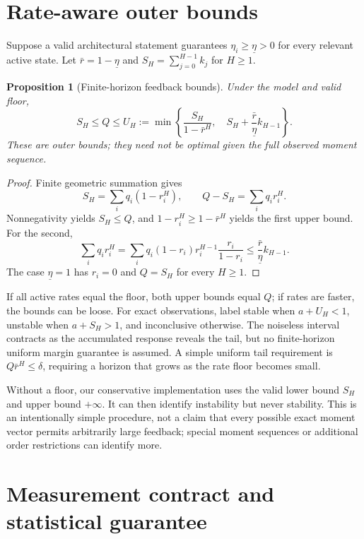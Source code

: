 \documentclass[11pt]{article}
\newtheorem{proposition}[theorem]{Proposition}
\theoremstyle{remark}\newtheorem{remark}[theorem]{Remark}
\newcommand{\floorate}{\underline\eta}
\begin{document}
\section{Rate-aware outer bounds}\label{sec:bounds}
Suppose a valid architectural statement guarantees $\eta_i\ge\floorate>0$ for every relevant active state. Let $\bar r=1-\floorate$ and $S_H=\sum_{j=0}^{H-1}k_j$ for $H\ge1$.
\begin{proposition}[Finite-horizon feedback bounds]\label{prop:bounds}
Under the model and valid floor,
\begin{equation}
 S_H\le Q\le U_H:=\min\left\{
 \frac{S_H}{1-\bar r^H},\quad
 S_H+\frac{\bar r}{\floorate}k_{H-1}\right\}.\label{eq:bounds}
\end{equation}
These are outer bounds; they need not be optimal given the full observed moment sequence.
\end{proposition}
\begin{proof}
Finite geometric summation gives
\begin{equation}
 S_H=\sum_iq_i(1-r_i^H),\qquad Q-S_H=\sum_iq_ir_i^H.
\end{equation}
Nonnegativity yields $S_H\le Q$, and $1-r_i^H\ge1-\bar r^H$ yields the first upper bound. For the second,
\begin{equation}
 \sum_iq_ir_i^H
 =\sum_iq_i(1-r_i)r_i^{H-1}\frac{r_i}{1-r_i}
 \le\frac{\bar r}{\floorate}k_{H-1}.
\end{equation}
The case $\floorate=1$ has $r_i=0$ and $Q=S_H$ for every $H\ge1$.
\end{proof}
If all active rates equal the floor, both upper bounds equal $Q$; if rates are faster, the bounds can be loose. For exact observations, label stable when $a+U_H<1$, unstable when $a+S_H>1$, and inconclusive otherwise. The noiseless interval contracts as the accumulated response reveals the tail, but no finite-horizon uniform margin guarantee is assumed. A simple uniform tail requirement is $Q\bar r^H\le\delta$, requiring a horizon that grows as the rate floor becomes small.

Without a floor, our conservative implementation uses the valid lower bound $S_H$ and upper bound $+\infty$. It can then identify instability but never stability. This is an intentionally simple procedure, not a claim that every possible exact moment vector permits arbitrarily large feedback; special moment sequences or additional order restrictions can identify more.

\section{Measurement contract and statistical guarantee}\label{sec:measurement}
\end{document}
